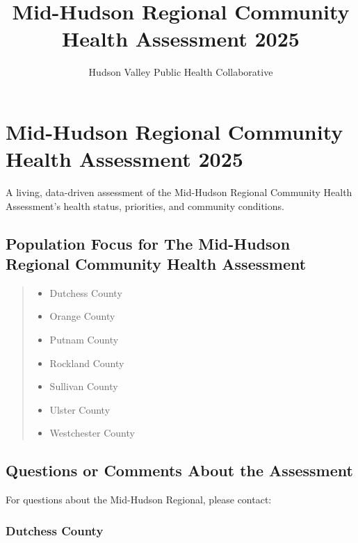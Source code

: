 \documentclass[
  english,
  letterpaper,
]{report}
\title{Mid-Hudson Regional Community Health Assessment 2025}
\author{Hudson Valley Public Health Collaborative}
\date{}
\providecommand{\tightlist}{%
  \setlength{\itemsep}{0pt}\setlength{\parskip}{0pt}}
\renewcommand*\contentsname{Table of contents}
\newcommand\contentsname{Table of contents}
\begin{document}
\maketitle

\renewcommand*\contentsname{Table of contents}
{
\hypersetup{linkcolor=}
\setcounter{tocdepth}{2}
\tableofcontents
}


\chapter{Mid-Hudson Regional Community Health Assessment
2025}\label{mid-hudson-regional-community-health-assessment-2025}

A living, data-driven assessment of the Mid-Hudson Regional Community
Health Assessment's health status, priorities, and community conditions.

\section{Population Focus for The Mid-Hudson Regional Community Health
Assessment}\label{population-focus-for-the-mid-hudson-regional-community-health-assessment}

\begin{quote}
\begin{itemize}
\tightlist
\item
  Dutchess County
\item
  Orange County
\item
  Putnam County
\item
  Rockland County
\item
  Sullivan County
\item
  Ulster County
\item
  Westchester County
\end{itemize}
\end{quote}

\section{Questions or Comments About the
Assessment}\label{questions-or-comments-about-the-assessment}

For questions about the Mid-Hudson Regional, please contact:

\subsection{Dutchess County}\label{dutchess-county}
\end{document}
